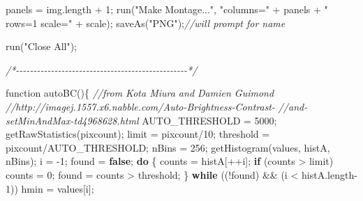 \documentclass[
  12pt,
  a4paper,
]{book}
\newenvironment{Shaded}{}{}
\newcommand{\CommentTok}[1]{\textcolor[rgb]{0.38,0.63,0.69}{\textit{#1}}}
\newcommand{\ControlFlowTok}[1]{\textcolor[rgb]{0.00,0.44,0.13}{\textbf{#1}}}
\newcommand{\DecValTok}[1]{\textcolor[rgb]{0.25,0.63,0.44}{#1}}
\newcommand{\KeywordTok}[1]{\textcolor[rgb]{0.00,0.44,0.13}{\textbf{#1}}}
\newcommand{\NormalTok}[1]{#1}
\newcommand{\OperatorTok}[1]{\textcolor[rgb]{0.40,0.40,0.40}{#1}}
\newcommand{\StringTok}[1]{\textcolor[rgb]{0.25,0.44,0.63}{#1}}
\begin{document}
\begin{Shaded}
\begin{Highlighting}[]
\NormalTok{panels }\OperatorTok{=}\NormalTok{ img}\OperatorTok{.}\NormalTok{length }\OperatorTok{+} \DecValTok{1}\OperatorTok{;}
\NormalTok{run}\OperatorTok{(}\StringTok{"Make Montage..."}\OperatorTok{,} \StringTok{"columns="} \OperatorTok{+}\NormalTok{ panels }\OperatorTok{+} \StringTok{" rows=1 scale="} \OperatorTok{+}\NormalTok{ scale}\OperatorTok{);}
\NormalTok{saveAs}\OperatorTok{(}\StringTok{"PNG"}\OperatorTok{);}\CommentTok{//will prompt for name}

\NormalTok{run}\OperatorTok{(}\StringTok{"Close All"}\OperatorTok{);}



\CommentTok{/*{-}{-}{-}{-}{-}{-}{-}{-}{-}{-}{-}{-}{-}{-}{-}{-}{-}{-}{-}{-}{-}{-}{-}{-}{-}{-}{-}{-}{-}{-}{-}{-}{-}{-}{-}{-}{-}{-}{-}{-}{-}{-}{-}{-}{-}{-}{-}{-}{-}*/}

\NormalTok{function autoBC}\OperatorTok{()\{}
\CommentTok{//from Kota Miura and Damien Guimond }
\CommentTok{//http://imagej.1557.x6.nabble.com/Auto{-}Brightness{-}Contrast{-}}
\CommentTok{//and{-}setMinAndMax{-}td4968628.html}
\NormalTok{    AUTO\_THRESHOLD }\OperatorTok{=} \DecValTok{5000}\OperatorTok{;} 
\NormalTok{    getRawStatistics}\OperatorTok{(}\NormalTok{pixcount}\OperatorTok{);} 
\NormalTok{    limit }\OperatorTok{=}\NormalTok{ pixcount}\OperatorTok{/}\DecValTok{10}\OperatorTok{;} 
\NormalTok{    threshold }\OperatorTok{=}\NormalTok{ pixcount}\OperatorTok{/}\NormalTok{AUTO\_THRESHOLD}\OperatorTok{;} 
\NormalTok{    nBins }\OperatorTok{=} \DecValTok{256}\OperatorTok{;} 
\NormalTok{    getHistogram}\OperatorTok{(}\NormalTok{values}\OperatorTok{,}\NormalTok{ histA}\OperatorTok{,}\NormalTok{ nBins}\OperatorTok{);} 
\NormalTok{    i }\OperatorTok{=} \OperatorTok{{-}}\DecValTok{1}\OperatorTok{;} 
\NormalTok{    found }\OperatorTok{=} \KeywordTok{false}\OperatorTok{;} 
    \ControlFlowTok{do} \OperatorTok{\{} 
\NormalTok{            counts }\OperatorTok{=}\NormalTok{ histA}\OperatorTok{[++}\NormalTok{i}\OperatorTok{];} 
            \ControlFlowTok{if} \OperatorTok{(}\NormalTok{counts }\OperatorTok{\textgreater{}}\NormalTok{ limit}\OperatorTok{)}\NormalTok{ counts }\OperatorTok{=} \DecValTok{0}\OperatorTok{;} 
\NormalTok{            found }\OperatorTok{=}\NormalTok{ counts }\OperatorTok{\textgreater{}}\NormalTok{ threshold}\OperatorTok{;} 
    \OperatorTok{\}} \ControlFlowTok{while} \OperatorTok{((!}\NormalTok{found}\OperatorTok{)} \OperatorTok{\&\&} \OperatorTok{(}\NormalTok{i }\OperatorTok{\textless{}}\NormalTok{ histA}\OperatorTok{.}\NormalTok{length}\OperatorTok{{-}}\DecValTok{1}\OperatorTok{))} 
\NormalTok{    hmin }\OperatorTok{=}\NormalTok{ values}\OperatorTok{[}\NormalTok{i}\OperatorTok{];} 

\end{Highlighting}
\end{Shaded}
\end{document}
